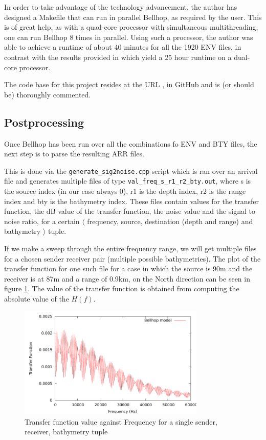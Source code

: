 \documentclass[a4paper]{IEEEtran}
\begin{document}
In order to take advantage of the technology advancement, the author
has designed a Makefile that can run in parallel Bellhop, as required
by the user. This is of great help, as with a quad-core processor with
simultaneous multithreading, one can run Bellhop 8 times in
parallel. Using such a processor, the author was able to achieve a
runtime of about 40 minutes for all the 1920 ENV files, in contrast
with the results provided in \cite{book} which yield a 25 hour runtime
on a dual-core processor.

The code base for this project resides at the URL \cite{github}, in
GitHub and is (or should be) thoroughly commented.

\subsection{Postprocessing}
\label{subsec:post}
Once Bellhop has been run over all the combinations fo ENV and BTY
files, the next step is to parse the resulting ARR files.

This is done via the \texttt{generate\_sig2noise.cpp} script which is
ran over an arrival file and generates multiple files of type
\texttt{val\_freq\_s\_r1\_r2\_bty.out}, where s is the source index (in
our case always 0), r1 is the depth index, r2 is the range index and
bty is the bathymetry index. These files contain values for the
transfer function, the dB value of the transfer function, the noise
value and the signal to noise ratio, for a certain $\langle$ frequency,
source, destination (depth and range) and bathymetry $\rangle$ tuple.

If we make a sweep through the entire frequency range, we will get
multiple files for a chosen sender receiver pair (multiple possible
bathymetries). The plot of the transfer function for one such file for
a case in which the source is 90m and the receiver is at 87m and a
range of 0.9km, on the North direction can be seen in figure
\ref{fig:hreal}. The value of the transfer function is obtained from
computing the absolute value of the $H(f)$.

\begin{figure}[ht]
  \centering
  \includegraphics[width=3.5in]{../postprocessing/hreal00.pdf}
  \caption{\small{Transfer function value against Frequency for a
      single sender, receiver, bathymetry tuple}}
  \label{fig:hreal}
\end{figure}
\end{document}

